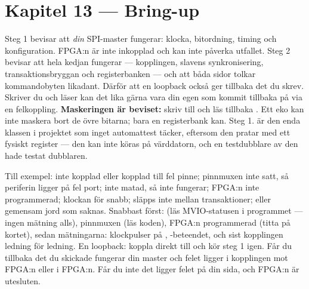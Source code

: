 \section*{Kapitel 13 --- Bring-up}

 Steg 1 bevisar att \emph{din} SPI-master fungerar: klocka, bitordning, timing och
konfiguration. FPGA:n är inte inkopplad och kan inte påverka utfallet. Steg 2 bevisar att hela
kedjan fungerar --- kopplingen, slavens synkronisering, transaktionsbryggan och registerbanken ---
och att båda sidor tolkar kommandobyten likadant.
 Därför att en loopback också ger tillbaka det du skrev. Skriver du  och
läser  kan det lika gärna vara din egen  som kommit tillbaka på
 via en felkoppling. \textbf{Maskeringen är beviset:} skriv  till
 och läs tillbaka . Ett eko kan inte maskera bort de övre bitarna;
bara en registerbank kan.
 Steg 1.  är den enda klassen i projektet som inget automattest
täcker, eftersom den pratar med ett fysiskt register --- den kan inte köras på värddatorn, och en
testdubblare av den hade testat dubblaren.

 Till exempel:  inte kopplad eller kopplad till fel pinne; pinnmuxen inte satt,
så periferin ligger på fel port;  inte matad, så  inte fungerar;
FPGA:n inte programmerad; klockan för snabb;  släpps inte mellan transaktioner; eller
gemensam jord som saknas.
 Snabbast först:  (läs MVIO-statusen i programmet --- ingen mätning alls),
pinnmuxen (läs koden), FPGA:n programmerad (titta på kortet), sedan mätningarna: klockpulser på
, -beteendet, och sist kopplingen ledning för ledning.
 En loopback: koppla  direkt till  och kör steg 1 igen. Får du
tillbaka det du skickade fungerar din master och felet ligger i kopplingen mot FPGA:n eller i
FPGA:n. Får du inte det ligger felet på din sida, och FPGA:n är utesluten.

